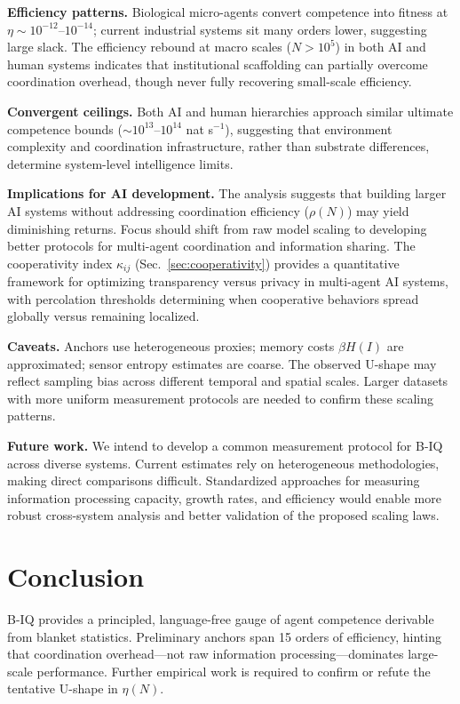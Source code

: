 \documentclass[10pt,conference]{IEEEtran}
\begin{document}
\textbf{Efficiency patterns.} Biological micro-agents convert competence into fitness at $\eta \sim 10^{-12}$--$10^{-14}$; current industrial systems sit many orders lower, suggesting large slack. The efficiency rebound at macro scales ($N > 10^5$) in both AI and human systems indicates that institutional scaffolding can partially overcome coordination overhead, though never fully recovering small-scale efficiency.

\textbf{Convergent ceilings.} Both AI and human hierarchies approach similar ultimate competence bounds ($\sim 10^{13}$--$10^{14}$ nat s$^{-1}$), suggesting that environment complexity and coordination infrastructure, rather than substrate differences, determine system-level intelligence limits.

\textbf{Implications for AI development.} The analysis suggests that building larger AI systems without addressing coordination efficiency ($\rho(N)$) may yield diminishing returns. Focus should shift from raw model scaling to developing better protocols for multi-agent coordination and information sharing. The cooperativity index $\kappa_{ij}$ (Sec.~\ref{sec:cooperativity}) provides a quantitative framework for optimizing transparency versus privacy in multi-agent AI systems, with percolation thresholds determining when cooperative behaviors spread globally versus remaining localized.

\textbf{Caveats.} Anchors use heterogeneous proxies; memory costs $\beta H(I)$ are approximated; sensor entropy estimates are coarse. The observed U-shape may reflect sampling bias across different temporal and spatial scales. Larger datasets with more uniform measurement protocols are needed to confirm these scaling patterns.

\textbf{Future work.} We intend to develop a common measurement protocol for B-IQ across diverse systems. Current estimates rely on heterogeneous methodologies, making direct comparisons difficult. Standardized approaches for measuring information processing capacity, growth rates, and efficiency would enable more robust cross-system analysis and better validation of the proposed scaling laws.

\section{Conclusion}
B-IQ provides a principled, language-free gauge of agent competence derivable from blanket statistics.  Preliminary anchors span 15 orders of efficiency, hinting that coordination overhead—not raw information processing—dominates large-scale performance.  Further empirical work is required to confirm or refute the tentative U-shape in \(\eta(N)\).
\end{document}
